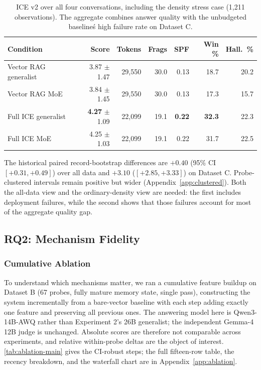 \documentclass[11pt,a4paper]{article}
\begin{document}
\begin{table}[htbp]
\centering
\small
\caption{ICE v2 over all four conversations, including the density stress case (1,211 observations). The aggregate combines answer quality with the unbudgeted baseline\'s high failure rate on Dataset C.}
\label{tab:exp2-alldata}
\begin{tabular}{@{}lrrrrrr@{}}
\toprule
\textbf{Condition} & \textbf{Score} & \textbf{Tokens} & \textbf{Frags} & \textbf{SPF} & \textbf{Win \%} & \textbf{Hall.\ \%} \\
\midrule
Vector RAG generalist & 3.87 $\pm$ 1.47 & 29{,}550 & 30.0 & 0.13 & 18.7 & 20.2 \\
Vector RAG MoE        & 3.84 $\pm$ 1.45 & 29{,}550 & 30.0 & 0.13 & 17.3 & 15.7 \\
Full ICE generalist   & \textbf{4.27} $\pm$ 1.09 & 22{,}099 & 19.1 & \textbf{0.22} & \textbf{32.3} & 22.3 \\
Full ICE MoE          & 4.25 $\pm$ 1.03 & 22{,}099 & 19.1 & 0.22 & 31.7 & 22.5 \\
\bottomrule
\end{tabular}
\end{table}

The historical paired record-bootstrap differences are $+0.40$ (95\% CI $[+0.31,+0.49]$) over all data and $+3.10$ ($[+2.85,+3.33]$) on Dataset C. Probe-clustered intervals remain positive but wider (Appendix~\ref{app:clustered}). Both the all-data view and the ordinary-density view are needed: the first includes deployment failures, while the second shows that those failures account for most of the aggregate quality gap.

\subsection{RQ2: Mechanism Fidelity}
\subsubsection{Cumulative Ablation}
\label{sec:ablation}

To understand which mechanisms matter, we ran a cumulative feature buildup on Dataset B (67 probes, fully mature memory state, single pass), constructing the system incrementally from a bare-vector baseline with each step adding exactly one feature and preserving all previous ones. The answering model here is Qwen3-14B-AWQ rather than Experiment 2's 26B generalist; the independent Gemma-4 12B judge is unchanged. Absolute scores are therefore not comparable across experiments, and relative within-probe deltas are the object of interest. \cref{tab:ablation-main} gives the CI-robust steps; the full fifteen-row table, the recency breakdown, and the waterfall chart are in Appendix~\ref{app:ablation}.
\end{document}
